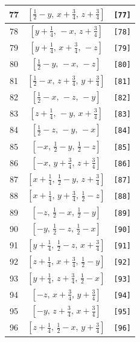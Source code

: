 \documentclass[fleqn,8pt]{jsarticle}
\begin{document}
\begin{longtable}{ccc}
77 & $\left[ \frac{1}{2} - y,\, x + \frac{3}{4},\, z + \frac{3}{4} \right]$ & {\tt [77]} \\ \hline
78 & $\left[ y + \frac{1}{4},\, - x,\, z + \frac{3}{4} \right]$ & {\tt [78]} \\ \hline
79 & $\left[ y + \frac{1}{4},\, x + \frac{3}{4},\, - z \right]$ & {\tt [79]} \\ \hline
80 & $\left[ \frac{1}{2} - y,\, - x,\, - z \right]$ & {\tt [80]} \\ \hline
81 & $\left[ \frac{1}{2} - x,\, z + \frac{3}{4},\, y + \frac{3}{4} \right]$ & {\tt [81]} \\ \hline
82 & $\left[ \frac{1}{2} - x,\, - z,\, - y \right]$ & {\tt [82]} \\ \hline
83 & $\left[ z + \frac{1}{4},\, - y,\, x + \frac{3}{4} \right]$ & {\tt [83]} \\ \hline
84 & $\left[ \frac{1}{2} - z,\, - y,\, - x \right]$ & {\tt [84]} \\ \hline
85 & $\left[ - x,\, \frac{1}{2} - y,\, \frac{1}{2} - z \right]$ & {\tt [85]} \\ \hline
86 & $\left[ - x,\, y + \frac{3}{4},\, z + \frac{3}{4} \right]$ & {\tt [86]} \\ \hline
87 & $\left[ x + \frac{1}{4},\, \frac{1}{2} - y,\, z + \frac{3}{4} \right]$ & {\tt [87]} \\ \hline
88 & $\left[ x + \frac{1}{4},\, y + \frac{3}{4},\, \frac{1}{2} - z \right]$ & {\tt [88]} \\ \hline
89 & $\left[ - z,\, \frac{1}{2} - x,\, \frac{1}{2} - y \right]$ & {\tt [89]} \\ \hline
90 & $\left[ - y,\, \frac{1}{2} - z,\, \frac{1}{2} - x \right]$ & {\tt [90]} \\ \hline
91 & $\left[ y + \frac{1}{4},\, \frac{1}{2} - z,\, x + \frac{3}{4} \right]$ & {\tt [91]} \\ \hline
92 & $\left[ z + \frac{1}{4},\, x + \frac{3}{4},\, \frac{1}{2} - y \right]$ & {\tt [92]} \\ \hline
93 & $\left[ y + \frac{1}{4},\, z + \frac{3}{4},\, \frac{1}{2} - x \right]$ & {\tt [93]} \\ \hline
94 & $\left[ - z,\, x + \frac{3}{4},\, y + \frac{3}{4} \right]$ & {\tt [94]} \\ \hline
95 & $\left[ - y,\, z + \frac{3}{4},\, x + \frac{3}{4} \right]$ & {\tt [95]} \\ \hline
96 & $\left[ z + \frac{1}{4},\, \frac{1}{2} - x,\, y + \frac{3}{4} \right]$ & {\tt [96]} \\ \hline

\end{longtable}
\end{document}
